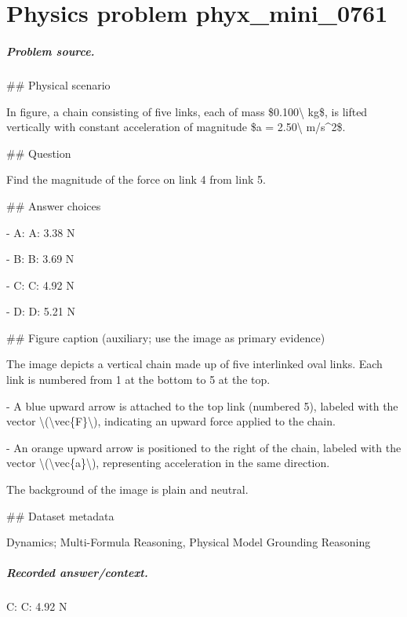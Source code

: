 
\chapter{Physics problem phyx\_mini\_0761}
\label{ch:PhyXMiniProblems_problem_phyx_mini_0761}

\paragraph{Problem source.}
\#\# Physical scenario

In figure, a chain consisting of five links, each of mass \$0.100\textbackslash{} kg\$, is lifted vertically with constant acceleration of magnitude \$a = 2.50\textbackslash{} m/s\textasciicircum{}2\$.

\#\# Question

Find the magnitude of the force on link 4 from link 5.

\#\# Answer choices

- A: A: 3.38 N

- B: B: 3.69 N

- C: C: 4.92 N

- D: D: 5.21 N

\#\# Figure caption (auxiliary; use the image as primary evidence)

The image depicts a vertical chain made up of five interlinked oval links. Each link is numbered from 1 at the bottom to 5 at the top.

- A blue upward arrow is attached to the top link (numbered 5), labeled with the vector \textbackslash{}(\textbackslash{}vec\{F\}\textbackslash{}), indicating an upward force applied to the chain.

- An orange upward arrow is positioned to the right of the chain, labeled with the vector \textbackslash{}(\textbackslash{}vec\{a\}\textbackslash{}), representing acceleration in the same direction. 

The background of the image is plain and neutral.

\#\# Dataset metadata

Dynamics; Multi-Formula Reasoning, Physical Model Grounding Reasoning

\paragraph{Recorded answer/context.}
C: C: 4.92 N

